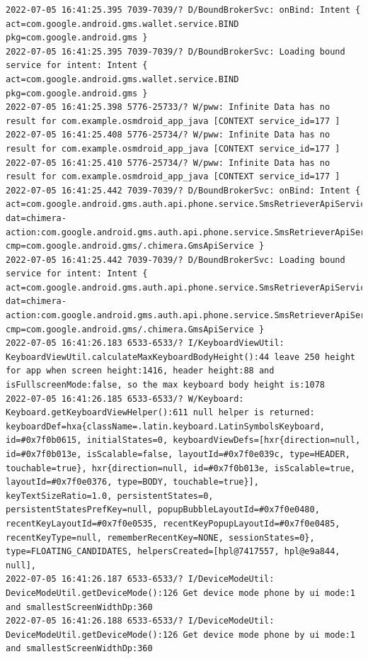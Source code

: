 \documentclass[a4paper,12pt]{book}
\begin{document}
\begin{lstlisting}
2022-07-05 16:41:25.395 7039-7039/? D/BoundBrokerSvc: onBind: Intent { act=com.google.android.gms.wallet.service.BIND pkg=com.google.android.gms }
2022-07-05 16:41:25.395 7039-7039/? D/BoundBrokerSvc: Loading bound service for intent: Intent { act=com.google.android.gms.wallet.service.BIND pkg=com.google.android.gms }
2022-07-05 16:41:25.398 5776-25733/? W/pww: Infinite Data has no result for com.example.osmdroid_app_java [CONTEXT service_id=177 ]
2022-07-05 16:41:25.408 5776-25734/? W/pww: Infinite Data has no result for com.example.osmdroid_app_java [CONTEXT service_id=177 ]
2022-07-05 16:41:25.410 5776-25734/? W/pww: Infinite Data has no result for com.example.osmdroid_app_java [CONTEXT service_id=177 ]
2022-07-05 16:41:25.442 7039-7039/? D/BoundBrokerSvc: onBind: Intent { act=com.google.android.gms.auth.api.phone.service.SmsRetrieverApiService.START dat=chimera-action:com.google.android.gms.auth.api.phone.service.SmsRetrieverApiService.START cmp=com.google.android.gms/.chimera.GmsApiService }
2022-07-05 16:41:25.442 7039-7039/? D/BoundBrokerSvc: Loading bound service for intent: Intent { act=com.google.android.gms.auth.api.phone.service.SmsRetrieverApiService.START dat=chimera-action:com.google.android.gms.auth.api.phone.service.SmsRetrieverApiService.START cmp=com.google.android.gms/.chimera.GmsApiService }
2022-07-05 16:41:26.183 6533-6533/? I/KeyboardViewUtil: KeyboardViewUtil.calculateMaxKeyboardBodyHeight():44 leave 250 height for app when screen height:1416, header height:88 and isFullscreenMode:false, so the max keyboard body height is:1078
2022-07-05 16:41:26.185 6533-6533/? W/Keyboard: Keyboard.getKeyboardViewHelper():611 null helper is returned: keyboardDef=hxa{className=.latin.keyboard.LatinSymbolsKeyboard, id=#0x7f0b0615, initialStates=0, keyboardViewDefs=[hxr{direction=null, id=#0x7f0b013e, isScalable=false, layoutId=#0x7f0e039c, type=HEADER, touchable=true}, hxr{direction=null, id=#0x7f0b013e, isScalable=true, layoutId=#0x7f0e0376, type=BODY, touchable=true}], keyTextSizeRatio=1.0, persistentStates=0, persistentStatesPrefKey=null, popupBubbleLayoutId=#0x7f0e0480, recentKeyLayoutId=#0x7f0e0535, recentKeyPopupLayoutId=#0x7f0e0485, recentKeyType=null, rememberRecentKey=NONE, sessionStates=0}, type=FLOATING_CANDIDATES, helpersCreated=[hpl@7417557, hpl@e9a844, null], 
2022-07-05 16:41:26.187 6533-6533/? I/DeviceModeUtil: DeviceModeUtil.getDeviceMode():126 Get device mode phone by ui mode:1 and smallestScreenWidthDp:360
2022-07-05 16:41:26.188 6533-6533/? I/DeviceModeUtil: DeviceModeUtil.getDeviceMode():126 Get device mode phone by ui mode:1 and smallestScreenWidthDp:360

\end{lstlisting}
\end{document}
